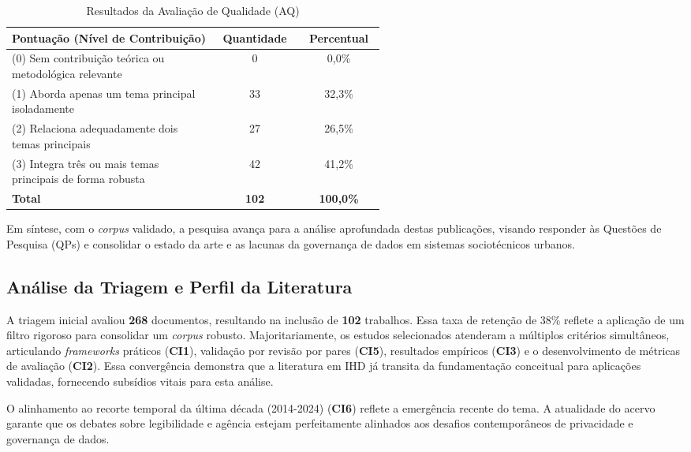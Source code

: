 \documentclass[12pt]{article}
\begin{document}
\begin{table}[H]
\centering
\caption{Resultados da Avaliação de Qualidade (AQ)}
\label{tab:resumo_qualidade}
\small
\begin{tabular}{p{0.55\linewidth} c c}
\hline
\textbf{Pontuação (Nível de Contribuição)} & \textbf{Quantidade} & \textbf{Percentual} \\
\hline
(0) Sem contribuição teórica ou metodológica relevante & 0 & 0,0\% \\
(1) Aborda apenas um tema principal isoladamente & 33 & 32,3\% \\
(2) Relaciona adequadamente dois temas principais & 27 & 26,5\% \\
(3) Integra três ou mais temas principais de forma robusta & 42 & 41,2\% \\
\hline
\textbf{Total} & \textbf{102} & \textbf{100,0\%} \\
\hline
\end{tabular}
\end{table}

Em síntese, com o \textit{corpus} validado, a pesquisa avança para a análise aprofundada destas publicações, visando responder às Questões de Pesquisa (QPs) e consolidar o estado da arte e as lacunas da governança de dados em sistemas sociotécnicos urbanos.

\subsection{Análise da Triagem e Perfil da Literatura}

A triagem inicial avaliou \textbf{268} documentos, resultando na inclusão de \textbf{102} trabalhos. Essa taxa de retenção de 38\% reflete a aplicação de um filtro rigoroso para consolidar um \textit{corpus} robusto. Majoritariamente, os estudos selecionados atenderam a múltiplos critérios simultâneos, articulando \textit{frameworks} práticos (\textbf{CI1}), validação por revisão por pares (\textbf{CI5}), resultados empíricos (\textbf{CI3}) e o desenvolvimento de métricas de avaliação (\textbf{CI2}). Essa convergência demonstra que a literatura em IHD já transita da fundamentação conceitual para aplicações validadas, fornecendo subsídios vitais para esta análise.

O alinhamento ao recorte temporal da última década (2014-2024) (\textbf{CI6}) reflete a emergência recente do tema. A atualidade do acervo garante que os debates sobre legibilidade e agência estejam perfeitamente alinhados aos desafios contemporâneos de privacidade e governança de dados.
\end{document}
